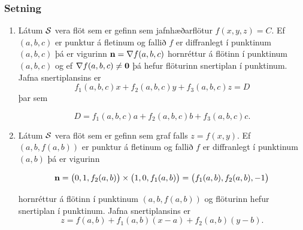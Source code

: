\subsubsection{Setning  }
\begin {enumerate}
 \item  Látum $\cal S$ vera flöt sem er gefinn sem jafnhæðarflötur 
     $f(x,y,z)=C$.   Ef $(a, b, c)$ er punktur á fletinum og
     fallið $f$ er diffranlegt í punktinum $(a, b,c)$ þá er vigurinn
     $\mbox{${\bf n}$}=\nabla f(a, b, c)$ hornréttur á flötinn í punktinum $(a,b, c)$ og ef $\nabla f(a, b, c)\neq \mbox{${\bf 0}$}$ þá hefur
flöturinn snertiplan í punktinum.  Jafna
     snertiplansins er
$$f_1(a, b, c)x+f_2(a, b, c)y+f_3(a, b, c)z=D$$ 
þar sem 

$$D= f_1(a, b, c)a+f_2(a, b, c)b
+f_3(a, b, c)c.$$

    \item
   Látum $\cal S$ vera flöt sem er gefinn sem graf falls 
     $z=f(x,y)$.   Ef $(a, b, f(a,b))$ er punktur á fletinum og
     fallið $f$ er diffranlegt í punktinum $(a, b)$ þá er vigurinn
     
     $$\mbox{${\bf n}$} =\big(0 ,1 ,f_2(a, b)\big)\times\big(1 ,0 ,f_1(a, b)\big)=\big(f_1(a, b), f_2(a, b), -1\big)$$ 

hornréttur á flötinn í punktinum $(a,b, f(a,b))$ og flöturinn hefur snertiplan í punktinum.  Jafna snertiplansins er
$$z=f(a, b)+f_1(a, b)(x-a)+f_2(a, b)(y-b).$$
\end{enumerate}
 
